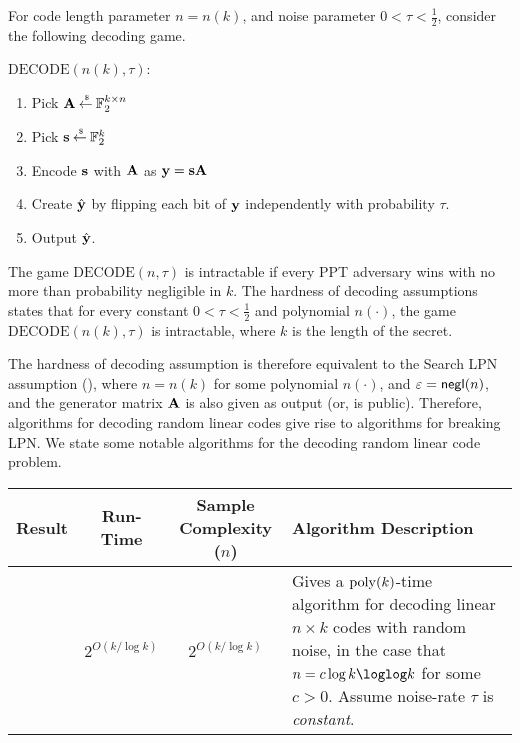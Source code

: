 For code length parameter $n = n(k)$, and noise parameter $0 < \tau < \frac{1}{2}$, consider the following decoding game.
\begin{boxedalgo}
	$\mathrm{DECODE}(n(k),\tau)$:
	\begin{enumerate}
		\item Pick ${\mathbf A} \mathbin{\stackrel{\mbox{\,\tiny \$}}{\gets}} {\mathbb F}_2^{k\times n}$
		\item Pick ${\mathbf s} \mathbin{\stackrel{\mbox{\,\tiny \$}}{\gets}} {\mathbb F}_2^k$
		\item Encode ${\mathbf s}$ with ${\mathbf A}$ as ${\mathbf y} = {\mathbf s}{\mathbf A}$
		\item Create $\hat{{\mathbf y}}$ by flipping each bit of ${\mathbf y}$ independently with probability $\tau$.
		\item Output $\hat{{\mathbf y}}$.
	\end{enumerate}
\end{boxedalgo}
The game $\mathrm{DECODE}(n,\tau)$ is intractable if every PPT adversary wins with no more than probability negligible in $k$.
The hardness of decoding assumptions states that for every constant $0 < \tau < \frac{1}{2}$ and polynomial $n(\cdot)$, the game $\mathrm{DECODE}(n(k),\tau)$ is intractable, where $k$ is the length of the secret.

The hardness of decoding assumption is therefore equivalent to the Search LPN assumption (), where $n = n(k)$ for some polynomial $n(\cdot)$, and $\varepsilon = \mathsf{negl}(n)$, and the generator matrix ${\mathbf A}$ is also given as output (or, is public).
Therefore, algorithms for decoding random linear codes give rise to algorithms for breaking LPN.
We state some notable algorithms for the decoding random linear code problem.

\bgroup
\renewcommand{\arraystretch}{1.5}
\begin{center}
\begin{tabular}{|c|c|c|>{\centering}p{}|}
	\hline
	Result & Run-Time & Sample Complexity ($n$) & Algorithm Description\tabularnewline
	\hline
	\cite{STOC:BluKalWas00} & $2^{O(k/\log k)}$ & $2^{O(k/\log k)}$ & Gives a $\operatorname{poly}(k)$-time algorithm for decoding linear $n\times k$ codes with random noise, in the case that $n = c\log k \loglog k$ for some $c > 0$. Assume noise-rate $\tau$ is {\em constant}.  \tabularnewline
	\hline
	
\end{tabular}
\end{center}
\egroup


